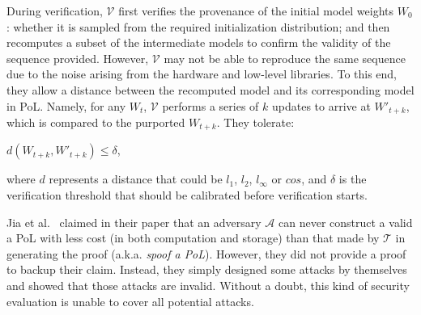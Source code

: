 \documentclass[conference]{IEEEtran}
\newcommand{\Prov}{\mathcal{T}\xspace}
\newcommand{\Verif}{\mathcal{V}\xspace}
\newcommand{\Adv}{\mathcal{A}\xspace}
\begin{document}
During verification, $\Verif$ first verifies the provenance of the initial {model\EndAccSupp{}} weights $W_0$: whether it is {sampled\EndAccSupp{}} from the {required\EndAccSupp{}} initialization distribution;
and then recomputes a subset of the intermediate {models\EndAccSupp{}} to confirm the validity of the {sequence\EndAccSupp{}} provided.
However, $\Verif$ may not be able to reproduce the same {sequence\EndAccSupp{}} due to the {noise\EndAccSupp{}} arising from the hardware and low-level libraries.
To this end, they allow a {distance\EndAccSupp{}} between the recomputed {model\EndAccSupp{}} and its corresponding {model\EndAccSupp{}} in PoL.
Namely, for any $W_t$, $\Verif$ performs a series of $k$ {updates\EndAccSupp{}} to arrive at $W'_{t+k}$, which is {compared\EndAccSupp{}} to the purported $W_{t+k}$.
They tolerate:
\begin{center}
    $d(W_{t+k}, W'_{t+k}) \leq \delta$,
\end{center}
where $d$ {represents\EndAccSupp{}} a distance that could be $l_1$, $l_2$, $l_{\infty}$ or $cos$,
and $\delta$ is the verification {threshold\EndAccSupp{}} that should be calibrated before verification starts.








Jia {et\EndAccSupp{}} al.~\cite{PoL} claimed in their paper that an {adversary\EndAccSupp{}} $\Adv$ can never construct a valid a PoL with less cost (in both {computation\EndAccSupp{}} and storage) than that made by $\Prov$ in {generating\EndAccSupp{}} the proof (a.k.a. {\em spoof a PoL}).
However, they did not provide a proof to backup their claim.
Instead, they simply {designed\EndAccSupp{}} some {attacks\EndAccSupp{}} by themselves and showed that those {attacks\EndAccSupp{}} are invalid. 
Without a doubt, this kind of {security\EndAccSupp{}} {evaluation\EndAccSupp{}} is unable to cover all potential attacks.
\end{document}
